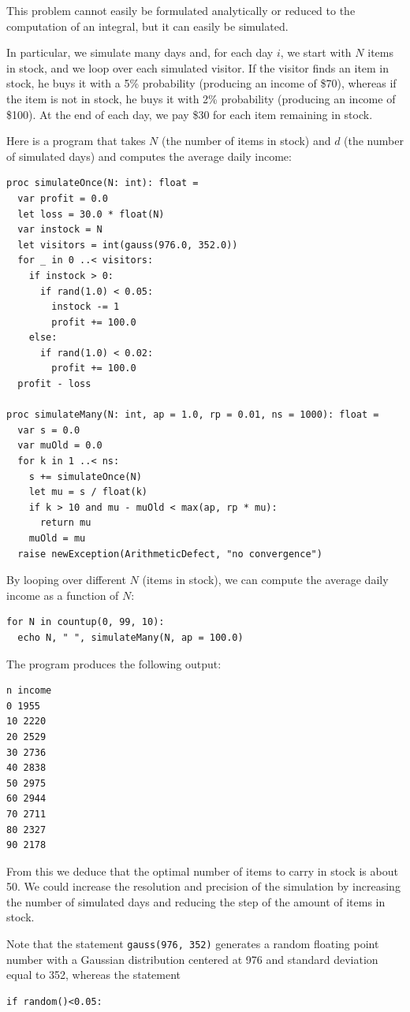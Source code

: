 \documentclass[justified, sixbynine]{tufte-book}
\def\ft{\small\tt}
\theoremstyle{plain}%
\newtheorem * {corollary}{Corollary}
\theoremstyle{definition}
\theoremstyle{remark}
\newtheorem * {remark}{Remark}
\newtheorem * {note}{Note}
\begin{document}
\begin{fullwidth}
This problem cannot easily be formulated analytically or reduced to
the computation of an integral, but it can easily be simulated.

In particular, we simulate many days and, for each day $i$, 
we start with $N$ items
in stock, and we loop over each simulated visitor. If the visitor
finds an item in stock, he buys it with a 5\% probability
(producing an income of \$70), whereas if the item is not in stock, 
 he buys it with 2\% probability (producing an income of \$100).
At the end of each day, we pay \$30 for each item remaining in stock.

Here is a program that takes $N$ (the number of items in stock) and $d$ (the
number of simulated days) and computes the average daily income:
\begin{lstlisting}
proc simulateOnce(N: int): float =
  var profit = 0.0
  let loss = 30.0 * float(N)
  var instock = N
  let visitors = int(gauss(976.0, 352.0))
  for _ in 0 ..< visitors:
    if instock > 0:
      if rand(1.0) < 0.05:
        instock -= 1
        profit += 100.0
    else:
      if rand(1.0) < 0.02:
        profit += 100.0
  profit - loss

proc simulateMany(N: int, ap = 1.0, rp = 0.01, ns = 1000): float =
  var s = 0.0
  var muOld = 0.0
  for k in 1 ..< ns:
    s += simulateOnce(N)
    let mu = s / float(k)
    if k > 10 and mu - muOld < max(ap, rp * mu):
      return mu
    muOld = mu
  raise newException(ArithmeticDefect, "no convergence")
\end{lstlisting}

By looping over different $N$ (items in stock), we can compute the average daily income as a function of $N$:
\begin{lstlisting}
for N in countup(0, 99, 10):
  echo N, " ", simulateMany(N, ap = 100.0)
\end{lstlisting}

The program produces the following output:
\begin{lstlisting}
n income
0 1955
10 2220
20 2529
30 2736
40 2838
50 2975
60 2944
70 2711
80 2327
90 2178
\end{lstlisting}

From this we deduce that the optimal number of items to carry in stock is
about 50. We could increase the resolution and precision of the simulation
by increasing the number of simulated days and reducing the step of the
amount of items in stock.

Note that the statement {\ft gauss(976, 352)} generates a random floating
point number with a Gaussian distribution centered at 976 and standard
deviation equal to 352, whereas the statement
\begin{lstlisting}
if random()<0.05:
\end{lstlisting}


\end{fullwidth}
\end{document}
